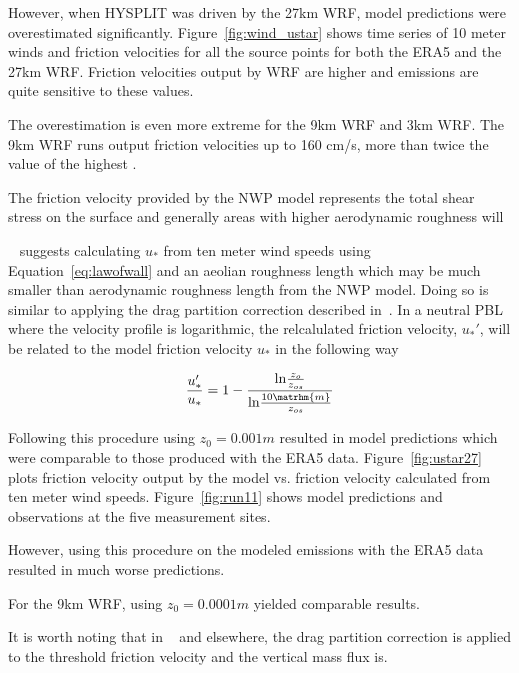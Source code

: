 However, when HYSPLIT was driven by the 27km WRF, model predictions were overestimated significantly. 
Figure~\ref{fig:wind_ustar} shows time series of 10 meter winds and friction velocities for all the source points for both the ERA5
and the 27km WRF. Friction velocities output by WRF are higher and emissions are quite sensitive to these values. 

The overestimation is even more extreme for the 9km WRF  and 3km WRF.
The 9km WRF runs output friction velocities up to 160 cm/s, more than twice the value of the highest .

The friction velocity provided by the NWP model represents the total shear stress on the surface and generally areas with higher aerodynamic roughness will 



~\cite{Darmenova} suggests calculating $u_*$ from ten meter wind speeds using Equation~\ref{eq:lawofwall} and an aeolian roughness length which may be much smaller than aerodynamic roughness length from the NWP model.  Doing so is similar to applying the 
drag partition correction described in~\citep{Marticorena97,MacKinnon04,Darmenova09}. 
In a neutral PBL where the velocity profile is logarithmic, the relcalulated friction velocity, $u_*'$, will be related to the model friction velocity $u_*$ in the following way

$$\frac{u_*'}{u_*} = 1 - \frac{\mathrm{ln}\frac{z_o}{z_{os}}}{\mathrm{ln}\frac{10\matrhm{m}}{z_{os}}} $$


Following this procedure using  $z_0=0.001m$  resulted in model predictions which were comparable to those produced with the ERA5 data. Figure~\ref{fig:ustar27} plots friction velocity output by the model vs. friction velocity calculated from ten meter wind speeds. Figure~\ref{fig:run11} shows model predictions and observations at the five measurement sites.

However, using this procedure on the modeled emissions with the ERA5 data resulted in much worse predictions.

For the 9km WRF, using $z_0=0.0001m$ yielded  comparable results.

It is worth noting that in ~\cite{Darmenova09} and elsewhere, the drag partition correction is applied to the threshold friction velocity and the vertical mass flux is.





